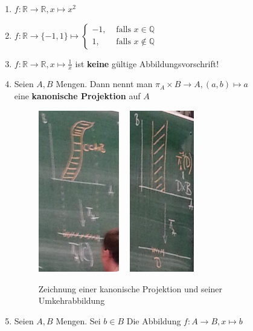\documentclass{scrartcl}
\begin{document}
\begin{enumerate}
 \item $f: \mathbb{R} \to \mathbb{R}, x \mapsto x^2$
 \item $f: \mathbb{R} \to \{-1,1\} \mapsto \left\{ 
    \begin{array}{rl}
       -1, & \text{ falls } x \in \mathbb{Q} \\
        1, & \text{ falls } x \notin \mathbb{Q}
    \end{array}\right.$
 \item $f: \mathbb{R} \to \mathbb{R}, x \mapsto \frac{1}{x}$ ist \textbf{keine} gültige Abbildungsvorschrift!
 \item Seien $A,B$ Mengen. Dann nennt man $\pi_A \times B \to A, (a,b) \mapsto a$ \\
   eine \textbf{kanonische Projektion} auf $A$ \\
    \begin{figure}[h!]
      \centering
        \includegraphics[width=100pt,height=200pt]{img/1/1}
        \includegraphics[width=100pt,height=200pt]{img/1/2}
      \caption{Zeichnung einer kanonische Projektion und seiner Umkehrabbildung}
    \end{figure} 
 \item Seien $A,B$ Mengen. Sei $b \in B$ Die Abbildung $f:A\to B, x \mapsto b$
\end{enumerate}
\end{document}
